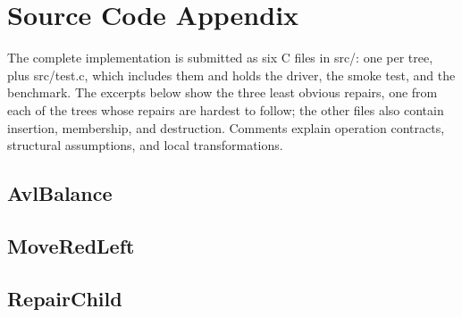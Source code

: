 \section{Source Code Appendix}

The complete implementation is submitted as six C files in src/\allowbreak{}: one per tree, plus src/\allowbreak{}test.c, which includes them and holds the driver, the smoke test, and the benchmark. The excerpts below show the three least obvious repairs, one from each of the trees whose repairs are hardest to follow; the other files also contain insertion, membership, and destruction. Comments explain operation contracts, structural assumptions, and local transformations.

\subsection{AvlBalance}



\subsection{MoveRedLeft}



\clearpage
\subsection{RepairChild}


